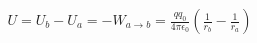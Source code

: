 \documentclass[preview]{standalone}
\begin{document}
\begin{align*}
U = U_b - U_a = - W_{a \rightarrow b} = \frac{q q_0}{4 \pi \epsilon_0} \left( \frac{1}{r_b} - \frac{1}{r_a} \right)
\end{align*}
\end{document}
